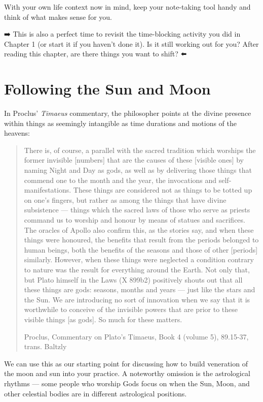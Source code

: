 \documentclass[
]{book}
\begin{document}
With your own life context now in mind, keep your note-taking tool handy and think of what makes sense for you.

➡️ This is also a perfect time to revisit the time-blocking activity you did in Chapter 1 (or start it if you haven't done it). Is it still working out for you? After reading this chapter, are there things you want to shift? ⬅️

\hypertarget{following-the-sun-and-moon}{%
\section{Following the Sun and Moon}\label{following-the-sun-and-moon}}

In Proclus' \emph{Timaeus} commentary, the philosopher points at the divine presence within things as seemingly intangible as time durations and motions of the heavens:

\begin{quote}
There is, of course, a parallel with the sacred tradition which worships the former invisible {[}numbers{]} that are the causes of these {[}visible ones{]} by naming Night and Day as gods, as well as by delivering those things that commend one to the month and the year, the invocations and self-manifestations. These things are considered not as things to be totted up on one's fingers, but rather as among the things that have divine subsistence --- things which the sacred laws of those who serve as priests command us to worship and honour by means of statues and sacrifices. The oracles of Apollo also confirm this, as the stories say, and when these things were honoured, the benefits that result from the periods belonged to human beings, both the benefits of the seasons and those of other {[}periods{]} similarly. However, when these things were neglected a condition contrary to nature was the result for everything around the Earth. Not only that, but Plato himself in the Laws (X 899b2) positively shouts out that all these things are gods: seasons, months and years --- just like the stars and the Sun. We are introducing no sort of innovation when we say that it is worthwhile to conceive of the invisible powers that are prior to these visible things {[}as gods{]}. So much for these matters.

Proclus, Commentary on Plato's Timaeus, Book 4 (volume 5), 89.15-37, trans. Baltzly
\end{quote}

We can use this as our starting point for discussing how to build veneration of the moon and sun into your practice. A noteworthy omission is the astrological rhythms --- some people who worship Gods focus on when the Sun, Moon, and other celestial bodies are in different astrological positions.
\end{document}
